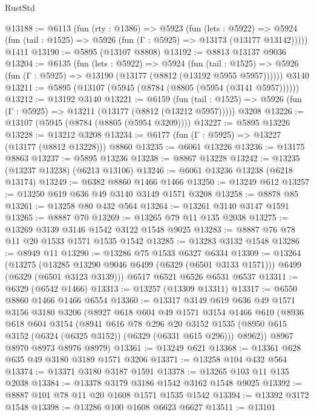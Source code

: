 \begin{lexlean}{RustStd}
\begin{coremodule}
{{@13188 := @6113
    (fun (rty : @1386) =>
    @5923
      (fun (lets : @5922) =>
      @5924 (fun (tail : @1525) => @5926 (fun (Γ : @5925) => @13173 (@13177 @13142)))))
    @1411
@13190 := @5895 (@13107 @8808)
@13192 := @8813 @13137 @9036
@13204 := @6135
    (fun (lets : @5922) =>
    @5924
      (fun (tail : @1525) =>
      @5926 (fun (Γ : @5925) => @13190 (@13177 (@8812 (@13192 @5955 @5957))))))
    @3140
@13211 := @5895 (@13107 (@5945 (@8784 (@8805 (@5954 (@3141 @5957))))))
@13212 := @13192 @3140
@13221 := @6159
    (fun (tail : @1525) => @5926 (fun (Γ : @5925) => @13211 (@13177 (@8812 (@13212 @5957)))))
    @3208
@13226 := @13107 (@5945 (@8784 (@8805 (@5954 @3209))))
@13227 := @5895 @13226
@13228 := @13212 @3208
@13234 := @6177 (fun (Γ : @5925) => @13227 (@13177 (@8812 @13228))) @8860
@13235 := @6061 @13226
@13236 := @13175 @8863
@13237 := @5895 @13236
@13238 := @8867 @13228
@13242 := @13235 (@13237 @13238) (@6213 @13106)
@13246 := @6061 @13236 @13238 (@6218 @13174)
@13249 := @6382 @8860 @1466 @1466
@13250 := @13249 @612
@13257 := @13250 @619 @636 @49 @3140 @3149 @1571 @3208
@13258 := @8878 @85
@13261 := @13258 @80 @432 @564
@13264 := @13261 @3140 @3147 @1591
@13265 := @8887 @70
@13269 := @13265 @79 @11 @135 @2038
@13275 := @13269 @3139 @3146 @1542 @3122 @1548 @9025
@13283 := @8887 @76 @78 @11 @20 @1533 @1571 @1535 @1542
@13285 := @13283 @3132 @1548
@13286 := @8949 @11
@13290 := @13286 @75 @1533 @6327 @6334
@13309 := @13264
    (@13275
      (@13285 @13290 @9046 @6499 (@6329 (@6501 @3133 @1571)))
      @6499
      (@6329 (@6501 @3123 @3139)))
    @6517
    @6521
    @6526
    @6531
    @6537
@13311 := @6329 (@6542 @1466)
@13313 := @13257 (@13309 @13311)
@13317 := @6550 @8860 @1466 @1466 @6554
@13360 := @13317
    @3149
    @619
    @636
    @49
    @1571
    @3156
    @3180
    @3206
    (@8927
      @618
      @604
      @49
      @1571
      @3154
      @1466
      @610
      (@8936
        @618
        @604
        @3154
        (@8941
          @616
          @78
          @296
          @20
          @3152
          @1535
          (@8950 @615 @3152 (@6324 (@6325 @3152)) (@6329 (@6331 @615 @296)))
          @8962))
      @8967
      @8970
      @8973
      @8976
      @8979)
@13361 := @13249 @621
@13368 := @13361 @628 @635 @49 @3180 @3189 @1571 @3206
@13371 := @13258 @104 @432 @564
@13374 := @13371 @3180 @3187 @1591
@13378 := @13265 @103 @11 @135 @2038
@13384 := @13378 @3179 @3186 @1542 @3162 @1548 @9025
@13392 := @8887 @101 @78 @11 @20 @1608 @1571 @1535 @1542
@13394 := @13392 @3172 @1548
@13398 := @13286 @100 @1608 @6623 @6627
@13511 := @13101
}}
\end{coremodule}
\end{lexlean}
